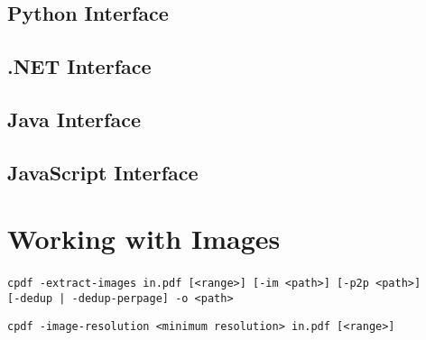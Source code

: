 \documentclass{book}
\begin{document}
\begin{pycpdflib}
\clearpage
\section*{Python Interface}
\begin{small}\tt

\end{small}
\end{pycpdflib}

\begin{dotnetcpdflib}
\clearpage
\section*{.NET Interface}
\begin{small}\tt

\end{small}
\end{dotnetcpdflib}

\begin{jcpdflib}
\clearpage
\section*{Java Interface}
\begin{small}\tt

\end{small}
\end{jcpdflib}

\begin{jscpdflib}
\clearpage
\section*{JavaScript Interface}
\begin{small}\tt

\end{small}
\end{jscpdflib}

\chapter{Working with Images}\label{chap:13}
\begin{framed}
\noindent\small\verb!cpdf -extract-images in.pdf [<range>] [-im <path>] [-p2p <path>]!
\noindent\small\verb!     [-dedup | -dedup-perpage] -o <path>!

\vspace{1.5mm}
\noindent\small\verb!cpdf -image-resolution <minimum resolution> in.pdf [<range>]!
\end{framed}
\end{document}
